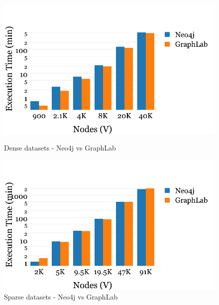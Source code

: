 	
	\begin{figure}
		\begin{minipage}{.5\textwidth}
			\centering
			\includegraphics[scale=0.5]{dense-nodes.pdf}
			\caption{Dense datasets - Neo4j vs GraphLab\label{fig:dense-nodes}}
		\end{minipage}
		\begin{minipage}{.5\textwidth}
			\centering
			\includegraphics[scale=0.5]{sparse-nodes.pdf}
			\caption{Sparse datasets - Neo4j vs GraphLab\label{fig:sparse-nodes}}
		\end{minipage}
	\end{figure}
	
